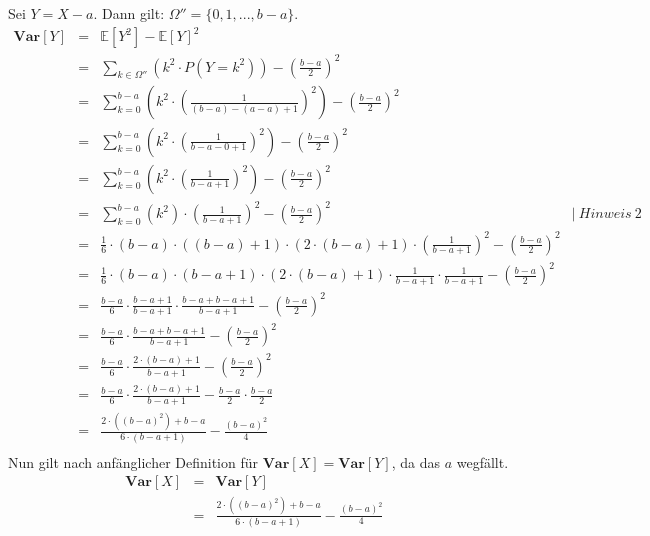 \documentclass[twoside]{article}
\begin{document}
\sss
Sei $Y = X - a$.
Dann gilt: $\Omega'' = \{0, 1, ..., b-a\}$.
\begin{equation*}
    \begin{array}{rlll}
        \textbf{Var}[Y]&=    &\mathbb{E}[Y^2] - \mathbb{E}[Y]^2&\\
            &=    &\sum_{k \in \Omega''}(k^2 \cdot P(Y = k^2)) - (\frac{b - a}{2})^2&\\
            &=    &\sum_{k = 0}^{b-a}(k^2 \cdot (\frac{1}{(b-a)-(a-a)+1})^2) - (\frac{b - a}{2})^2&\\
            &=    &\sum_{k = 0}^{b-a}(k^2 \cdot (\frac{1}{b-a-0+1})^2) - (\frac{b - a}{2})^2&\\
            &=    &\sum_{k = 0}^{b-a}(k^2 \cdot (\frac{1}{b-a+1})^2) - (\frac{b - a}{2})^2&\\
            &=    &\sum_{k = 0}^{b-a}(k^2) \cdot (\frac{1}{b-a+1})^2 - (\frac{b - a}{2})^2& |~Hinweis~2\\
            &=    &\frac{1}{6}\cdot (b - a)\cdot((b - a) + 1)\cdot(2\cdot (b - a) + 1) \cdot (\frac{1}{b-a+1})^2 - (\frac{b - a}{2})^2&\\
            &=    &\frac{1}{6}\cdot (b - a)\cdot(b - a + 1)\cdot(2\cdot (b - a) + 1) \cdot \frac{1}{b-a+1} \cdot \frac{1}{b-a+1} - (\frac{b - a}{2})^2&\\
            &=    &\frac{b-a}{6} \cdot \frac{b-a+1}{b-a+1} \cdot \frac{b-a+b-a+1}{b-a+1} - (\frac{b - a}{2})^2&\\
            &=    &\frac{b-a}{6} \cdot \frac{b-a+b-a+1}{b-a+1} - (\frac{b - a}{2})^2&\\
            &=    &\frac{b-a}{6} \cdot \frac{2 \cdot (b-a)+1}{b-a+1} - (\frac{b - a}{2})^2&\\
            &=    &\frac{b-a}{6} \cdot \frac{2 \cdot (b-a)+1}{b-a+1} - \frac{b - a}{2} \cdot \frac{b - a}{2}&\\
            &=    &\frac{2 \cdot ((b-a)^2)+b-a}{6\cdot(b - a + 1)} - \frac{(b-a)^2}{4}&\\
    \end{array}
\end{equation*}
Nun gilt nach anfänglicher Definition für $\textbf{Var}[X] =\textbf{Var}[Y]$, da das $a$ wegfällt.
\begin{equation*}
    \begin{array}{rlll}
        \textbf{Var}[X]&=    &\textbf{Var}[Y]&\\
            &=    &\frac{2 \cdot ((b-a)^2)+b-a}{6\cdot(b - a + 1)} - \frac{(b-a)^2}{4}&\\
    \end{array}
\end{equation*}
\end{document}

